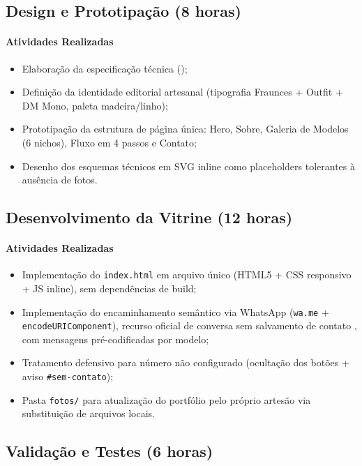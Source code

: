 \documentclass[12pt,a4paper]{article}
\begin{document}
\subsection{Design e Prototipação (8 horas)}

\paragraph{Atividades Realizadas}
\begin{itemize}[leftmargin=*]
\item Elaboração da especificação técnica ();
\item Definição da identidade editorial artesanal (tipografia Fraunces + Outfit + DM Mono, paleta madeira/linho);
\item Prototipação da estrutura de página única: Hero, Sobre, Galeria de Modelos (6 nichos), Fluxo em 4 passos e Contato;
\item Desenho dos esquemas técnicos em SVG inline como placeholders tolerantes à ausência de fotos.
\end{itemize}

\subsection{Desenvolvimento da Vitrine (12 horas)}

\paragraph{Atividades Realizadas}
\begin{itemize}[leftmargin=*]
\item Implementação do \texttt{index.html} em arquivo único (HTML5 + CSS responsivo + JS inline), sem dependências de build;
\item Implementação do encaminhamento semântico via WhatsApp (\texttt{wa.me} + \texttt{encodeURIComponent}), recurso oficial de conversa sem salvamento de contato \cite{whatsapp}, com mensagens pré-codificadas por modelo;
\item Tratamento defensivo para número não configurado (ocultação dos botões + aviso \texttt{\#sem-contato});
\item Pasta \texttt{fotos/} para atualização do portfólio pelo próprio artesão via substituição de arquivos locais.
\end{itemize}

\subsection{Validação e Testes (6 horas)}
\end{document}
